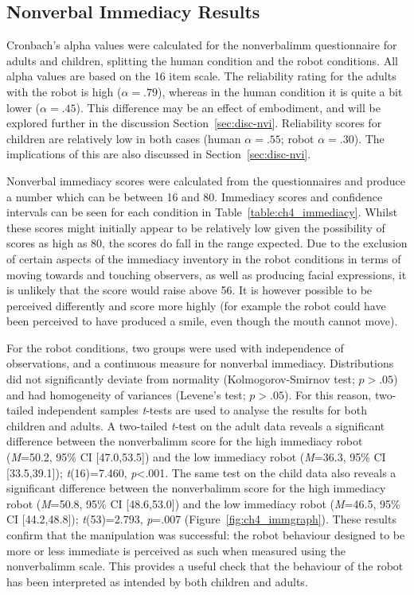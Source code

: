 \subsection{Nonverbal Immediacy Results} \label{sec:res-imm}
Cronbach's alpha values were calculated for the \gls{nonverbalimm} questionnaire for adults and children, splitting the human condition and the robot conditions. All alpha values are based on the 16 item scale. The reliability rating for the adults with the robot is high ($\alpha=.79$), whereas in the human condition it is quite a bit lower ($\alpha=.45$). This difference may be an effect of embodiment, and will be explored further in the discussion Section~\ref{sec:disc-nvi}. Reliability scores for children are relatively low in both cases (human $\alpha=.55$; robot $\alpha=.30$). The implications of this are also discussed in Section~\ref{sec:disc-nvi}.

Nonverbal immediacy scores were calculated from the questionnaires and produce a number which can be between 16 and 80. Immediacy scores and confidence intervals can be seen for each condition in Table~\ref{table:ch4_immediacy}. Whilst these scores might initially appear to be relatively low given the possibility of scores as high as 80, the scores do fall in the range expected. Due to the exclusion of certain aspects of the \gls{immediacy} inventory in the robot conditions in terms of moving towards and touching observers, as well as producing facial expressions, it is unlikely that the score would raise above 56. It is however possible to be perceived differently and score more highly (for example the robot could have been perceived to have produced a smile, even though the mouth cannot move).

For the robot conditions, two groups were used with independence of observations, and a continuous measure for nonverbal immediacy. Distributions did not significantly deviate from normality (Kolmogorov-Smirnov test; $\textit{p}>.05$) and had homogeneity of variances (Levene's test; $\textit{p}>.05$). For this reason, two-tailed independent samples \textit{t}-tests are used to analyse the results for both children and adults. A two-tailed \textit{t}-test on the adult data reveals a significant difference between the \gls{nonverbalimm} score for the high immediacy robot (\textit{M}=50.2, 95\% CI [47.0,53.5]) and the low immediacy robot (\textit{M}=36.3, 95\% CI [33.5,39.1]); \textit{t}(16)=7.460, \textit{p}\textless .001. The same test on the child data also reveals a significant difference between the \gls{nonverbalimm} score for the high immediacy robot (\textit{M}=50.8, 95\% CI [48.6,53.0]) and the low immediacy robot (\textit{M}=46.5, 95\% CI [44.2,48.8]); \textit{t}(53)=2.793, \textit{p}=.007 (Figure~\ref{fig:ch4_immgraph}). These results confirm that the manipulation was successful: the robot behaviour designed to be more or less immediate is perceived as such when measured using the \gls{nonverbalimm} scale. This provides a useful check that the behaviour of the robot has been interpreted as intended by both children and adults.

